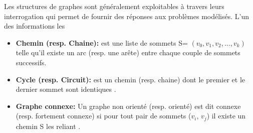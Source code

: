 Les structures de graphes sont généralement exploitables à travers leurs interrogation qui permet de fournir des réponses aux problèmes modélisés. L'un des informations les
	
	\begin{itemize} [label = $\bullet$]
		
			 
			 \item \textbf{Chemin (resp. Chaine):}
			est une liste de sommets S= $(v_{0},v_{1},v_{2},...,v_{k})$ telle qu’il existe un arc (resp. une arête) entre chaque couple de sommets successifs.
			 
			 
			  \item \textbf{Cycle (resp. Circuit):} 
			 est un chemin (resp. chaine) dont le premier et le dernier sommet sont identiques \citep{DUT}.
			 
			 		\item \textbf{Graphe connexe:}
			Un graphe non orienté (resp. orienté) est dit connexe (resp. fortement connexe) si pour tout pair de sommets ($v_{i}$, $v_{j}$) il existe un chemin S les reliant \citep{muller}.
			 
		\end{itemize}